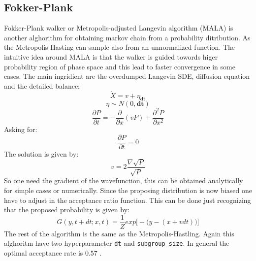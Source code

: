\documentclass{article}
\begin{document}
\subsection{Fokker-Plank}
Fokker-Plank walker or Metropolis-adjusted Langevin algorithm (MALA) is another alghorithm for obtaining markov chain from a probability ditribution. As the Metropolis-Hasting can sample also from an unnormalized function. The intuitive idea around MALA is that the walker is guided towords higer probability region of phase space and this lead to faster convergence in some cases\cite{MALABest}. The main ingridient are the overdumped Langevin SDE, diffusion equation and the detailed balance:
\begin{equation}
        \dot X = v + \eta_{\mathbf{dt}} 
\end{equation}
\begin{equation}
        \eta \sim N(0,\mathbf{dt})
\end{equation}
\begin{equation}
    \frac{\partial P}{\partial t} = -\frac{\partial}{\partial x} (vP) + \frac{\partial^2 P}{\partial x^2}
\end{equation}
Asking for:
\begin{equation}
    \frac{\partial P}{\partial t} = 0
\end{equation}
The solution is given by:
\begin{equation}
    v = 2\frac{\nabla \sqrt{P}}{\sqrt{P}}
\end{equation}
So one need the gradient of the wavefunction, this can be obtained analytically for simple cases or numerically. Since the proposing distribution is now biased one have to adjust in the acceptance ratio function. This can be done just recognizing that the proposed probability is given by:
\begin{equation}
    G(y, t+dt; x, t) = \frac{1}{Z} exp\Big[-\big(y-(x+v dt))\Big]
\end{equation}
The rest of the algorithm is the same as the Metropolis-Hastling. Again this alghoritm have two hyperparameter \texttt{dt} and  \texttt{subgroup\_size}. In general the optimal acceptance rate is 0.57 \cite{MALAAcc}.
\end{document}
